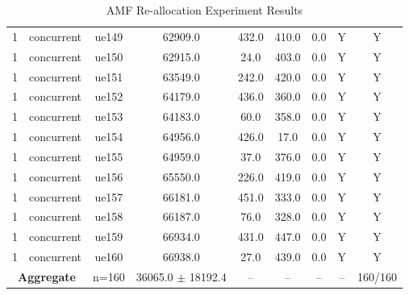 \begin{table}[ht]
\begin{tabular}{|c|c|c|c|c|c|c|c|c|}
1 & concurrent & ue149 & 62909.0 & 432.0 & 410.0 & 0.0 & Y & Y \\
1 & concurrent & ue150 & 62915.0 & 24.0 & 403.0 & 0.0 & Y & Y \\
1 & concurrent & ue151 & 63549.0 & 242.0 & 420.0 & 0.0 & Y & Y \\
1 & concurrent & ue152 & 64179.0 & 436.0 & 360.0 & 0.0 & Y & Y \\
1 & concurrent & ue153 & 64183.0 & 60.0 & 358.0 & 0.0 & Y & Y \\
1 & concurrent & ue154 & 64956.0 & 426.0 & 17.0 & 0.0 & Y & Y \\
1 & concurrent & ue155 & 64959.0 & 37.0 & 376.0 & 0.0 & Y & Y \\
1 & concurrent & ue156 & 65550.0 & 226.0 & 419.0 & 0.0 & Y & Y \\
1 & concurrent & ue157 & 66181.0 & 451.0 & 333.0 & 0.0 & Y & Y \\
1 & concurrent & ue158 & 66187.0 & 76.0 & 328.0 & 0.0 & Y & Y \\
1 & concurrent & ue159 & 66934.0 & 431.0 & 447.0 & 0.0 & Y & Y \\
1 & concurrent & ue160 & 66938.0 & 27.0 & 439.0 & 0.0 & Y & Y \\
\multicolumn{2}{|c|}{\textbf{Aggregate}} & n=160 & 36065.0 $\pm$ 18192.4 & -- & -- & -- & -- & 160/160 \\
\hline
\end{tabular}
\caption{AMF Re-allocation Experiment Results}
\label{tab:amf_realloc}
\end{table}
